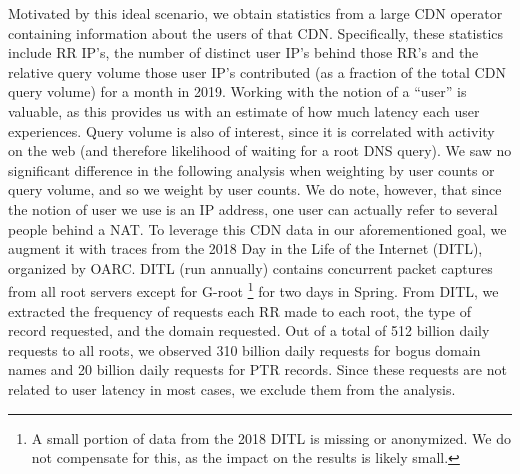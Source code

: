 \documentclass[sigconf,nonacm,10pt]{acmart}
\begin{document}
\label{sec:rr_global_look_data} Motivated by this ideal scenario, we
obtain statistics from a large CDN operator containing information about
the users of that CDN. Specifically, these statistics include RR IP's,
the number of distinct user IP's behind those RR's and the relative
query volume those user IP's contributed (as a fraction of the total CDN
query volume) for a month in 2019. Working with the notion of a ``user''
is valuable, as this provides us with an estimate of how much latency
each user experiences. Query volume is also of interest, since it is
correlated with activity on the web (and therefore likelihood of waiting
for a root DNS query). We saw no significant difference in the following
analysis when weighting by user counts or query volume, and so we weight
by user counts. We do note, however, that since the notion of user we
use is an IP address, one user can actually refer to several people
behind a NAT. \break \break
To leverage this CDN data in our aforementioned goal, we augment it with
traces from the 2018 Day in the Life of the Internet (DITL), organized
by OARC. DITL (run annually) contains concurrent packet captures from
all root servers except for G-root
\footnote{ A small portion of data from the 2018 DITL is missing or anonymized. We do not compensate for this, as the impact on the results is likely small. }
for two days in Spring. From DITL, we extracted the frequency of
requests each RR made to each root, the type of record requested, and
the domain requested. \break
Out of a total of 512 billion daily requests to all roots, we observed
310 billion daily requests for bogus domain names and 20 billion daily
requests for PTR records. Since these requests are not related to user
latency in most cases, we exclude them from the analysis.
\end{document}
